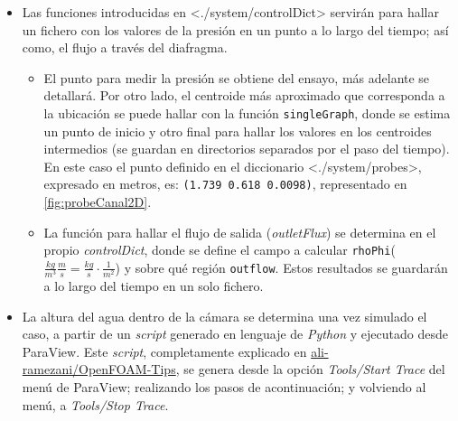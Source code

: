 \begin{itemize}
  \begin{itemize}
  \item
    Las funciones introducidas en
    \textless{}./system/controlDict\textgreater{} servirán para hallar
    un fichero con los valores de la presión en un punto a lo largo del
    tiempo; así como, el flujo a través del diafragma.

    \begin{itemize}
    \item
      El punto para medir la presión se obtiene del ensayo, más adelante
      se detallará. Por otro lado, el centroide más aproximado que
      corresponda a la ubicación se puede hallar con la función
      \texttt{singleGraph}, donde se estima un punto de inicio y otro
      final para hallar los valores en los centroides intermedios (se
      guardan en directorios separados por el paso del tiempo). En este
      caso el punto definido en el diccionario
      \textless{}./system/probes\textgreater{}, expresado en metros, es:
      \texttt{(1.739\ 0.618\ 0.0098)}, representado en \autoref{fig:probeCanal2D}.



    \item
      La función para hallar el flujo de salida (\emph{outletFlux}) se
      determina en el propio \emph{controlDict}, donde se define el
      campo a calcular
      \texttt{rhoPhi}(\(\frac {kg}{m^3} \frac {m}{s}= \frac {kg}{s} · \frac {1}{m^2}\))
      y sobre qué región \texttt{outflow}. Estos resultados se guardarán
      a lo largo del tiempo en un solo fichero.
    \end{itemize}
  \item
    La altura del agua dentro de la cámara se determina una vez simulado
    el caso, a partir de un \emph{script} generado en lenguaje de
    \emph{Python} y ejecutado desde ParaView. Este \emph{script},
    completamente explicado en
    \href{https://github.com/ali-ramezani/OpenFOAM-Tips}{ali-ramezani/OpenFOAM-Tips},
    se genera desde la opción \emph{Tools/Start Trace} del menú de
    ParaView; realizando los pasos de acontinuación; y volviendo al
    menú, a \emph{Tools/Stop Trace}.


\end{itemize}
\end{itemize}

